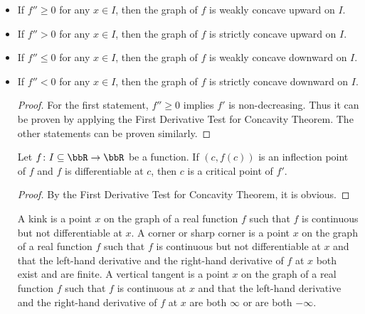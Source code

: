 \documentclass[a4paper,12pt]{report}
\begin{document}
\begin{itemize}
\begin{itemize}
\begin{proof}
    Let $a<b<c$ and $a,b,c\in I$. By MVT, there exists $A\in (a,b)$ such that
    \[f'(A)=\frac{f(b)-f(a)}{b-a},\]
    and there exists $B\in (b,c)$ such that
    \[f'(B)=\frac{f(c)-f(b)}{c-b}.\]
    Since $A<B$, $f'(A)\leq f'(B)$.
    \[\frac{f(b)-f(a)}{b-a}\leq\frac{f(c)-f(b)}{c-b}.\]
    \[(f(b)-f(a))(c-b)\leq(f(c)-f(b))(b-a).\]
    \[(c-a)f(b)\leq(b-a)f(c)+(c-b)f(a).\]
    \[f(b)\leq\frac{b-a}{c-a}f(c)+\frac{c-b}{c-a}f(a).\]
    Set
    \[\alpha=\frac{b-a}{c-a}\in(0,1).\]
    Then
    \[b=(1-\alpha)a+\alpha c.\]
    Thus the inequality becomes
    \[f\qty((1-\alpha)a+\alpha c)\leq(1-\alpha)f(a)+\alpha f(c).\]
    The other statements can be proven similarly.
\end{proof}
Let function $f\colon J\subseteq\mathbb{R}\to\mathbb{R}$ be twice differentiable on an open interval $I\subseteq J$.
\bit
\item If $f''\geq 0$ for any $x\in I$, then the graph of $f$ is weakly concave upward on $I$.
\item If $f''>0$ for any $x\in I$, then the graph of $f$ is strictly concave upward on $I$.
\item If $f''\leq 0$ for any $x\in I$, then the graph of $f$ is weakly concave downward on $I$.
\item If $f''<0$ for any $x\in I$, then the graph of $f$ is strictly concave downward on $I$.
\eit
\begin{proof}
For the first statement, $f''\geq 0$ implies $f'$ is non-decreasing. Thus it can be proven by applying the First Derivative Test for Concavity Theorem. The other statements can be proven similarly.
\end{proof}
Let $f\colon I\subseteq\bbR\to\bbR$ be a function. If $(c,f(c))$ is an inflection point of $f$ and $f$ is differentiable at $c$, then $c$ is a critical point of $f'$.
\begin{proof}
By the First Derivative Test for Concavity Theorem, it is obvious.
\end{proof}
A kink is a point $x$ on the graph of a real function $f$ such that $f$ is continuous but not differentiable at $x$.
A corner or sharp corner is a point $x$ on the graph of a real function $f$ such that $f$ is continuous but not differentiable at $x$ and that the left-hand derivative and the right-hand derivative of $f$ at $x$ both exist and are finite.
A vertical tangent is a point $x$ on the graph of a real function $f$ such that $f$ is continuous at $x$ and that the left-hand derivative and the right-hand derivative of $f$ at $x$ are both $\infty$ or are both $-\infty$.

\end{itemize}
\end{itemize}
\end{document}
